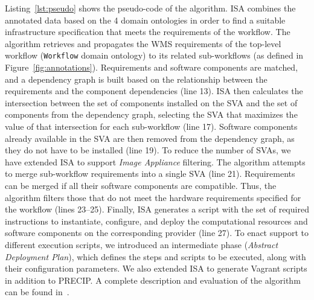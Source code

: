 Listing~\ref{lst:pseudo} shows the pseudo-code of the algorithm. ISA combines 
the annotated data based on the 4 domain ontologies in order to find a suitable 
infrastructure specification that meets the requirements of the workflow. The 
algorithm retrieves and propagates the WMS requirements of the top-level 
workflow (\texttt{Workflow} domain ontology) to its related sub-workflows (as 
defined in Figure~\ref{fig:annotations}). Requirements  and software components 
are matched, and a dependency graph is built based on the relationship between 
the requirements and the component dependencies (line 13). ISA then calculates 
the intersection between the set of components installed on the SVA and the set 
of components from the dependency graph, selecting the SVA that maximizes the 
value of that intersection for each sub-workflow (line 17). Software components 
already available in the SVA are then removed from the dependency graph, as they 
do not have to be installed (line 19). To reduce the number of SVAs, we have extended
ISA to support \emph{Image Appliance} filtering. The algorithm attempts to merge 
sub-workflow requirements into a single SVA (line 21). Requirements can be merged 
if all their software components are compatible. Thus, the algorithm filters those that 
do not meet the hardware requirements specified for the workflow (lines 23--25).
Finally, ISA generates a script with the set of required instructions to instantiate, 
configure, and deploy the computational resources and software components on 
the corresponding provider (line 27). To enact support to different execution scripts, 
we introduced an intermediate phase (\emph{Abstract Deployment Plan}), which 
defines the steps and scripts to be executed, along with their configuration 
parameters. We also extended ISA to generate Vagrant scripts in addition to
PRECIP. A complete description and evaluation of the algorithm can be found 
in~\cite{wicus}.

